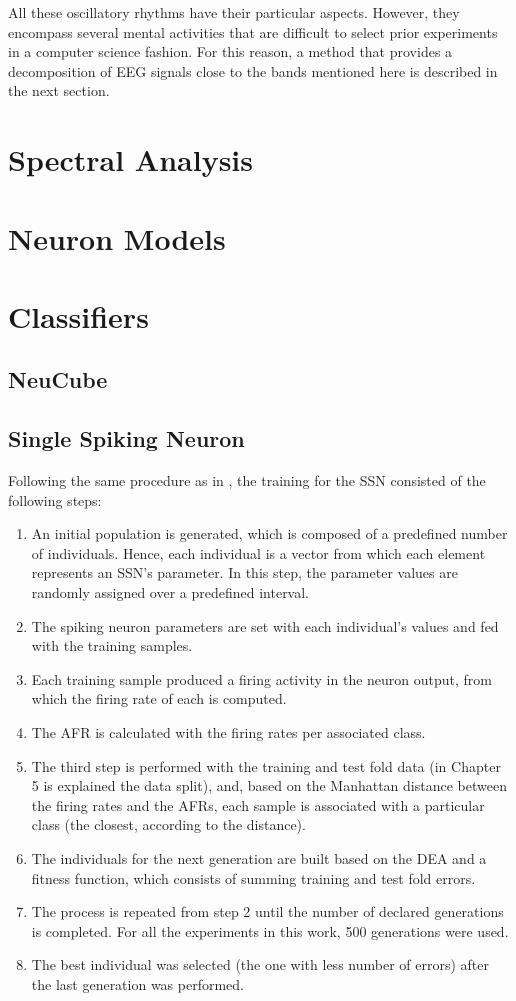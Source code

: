 All these oscillatory rhythms have their particular aspects. However, they encompass several mental activities that are difficult to select prior experiments in a computer science fashion. For this reason, a method that provides a decomposition of EEG signals close to the bands mentioned here is described in the next section.
\section{Spectral Analysis}
\section{Neuron Models}
\section{Classifiers}
\subsection{NeuCube}
\subsection{Single Spiking Neuron}
Following the same procedure as in \cite{vazquez2010pattern,vazquez2011training}, the training for the SSN consisted of the following steps:
\begin{enumerate}
	\item An initial population is generated, which is composed of a predefined number of individuals. Hence, each individual is a vector from which each element represents an SSN's parameter. In this step, the parameter values are randomly assigned over a predefined interval.
	\item The spiking neuron parameters are set with each individual's values and fed with the training samples.
	\item Each training sample produced a firing activity in the neuron output, from which the firing rate of each is computed. 
	\item The AFR is calculated with the firing rates per associated class.
	\item The third step is performed with the training and test fold data (in Chapter 5 is explained the data split), and, based on the Manhattan distance between the firing rates and the AFRs, each sample is associated with a particular class (the closest, according to the distance).
	\item The individuals for the next generation are built based on the DEA and a fitness function, which consists of summing training and test fold errors.
	\item The process is repeated from step 2 until the number of declared generations is completed. For all the experiments in this work,  500 generations were used.
	\item The best individual was selected (the one with less number of errors) after the last generation was performed.
\end{enumerate}